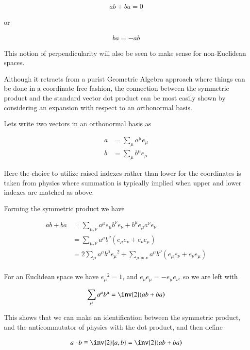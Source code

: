 \begin{align*}
a b + ba = 0
\end{align*}

or

\begin{align*}
b a = - a b
\end{align*}

This notion of perpendicularity will also be seen to make sense for non-Euclidean spaces.

Although it retracts from a purist Geometric Algebra approach where things can be done in a coordinate free fashion, the connection between the symmetric product and the standard vector dot product can be most easily shown by considering an expansion with respect to an orthonormal basis.

Lets write two vectors in an orthonormal basis as

\begin{align*}
a &= \sum_\mu a^\mu e_\mu \\
b &= \sum_\mu b^\mu e_\mu
\end{align*}

Here the choice to utilize raised indexes rather than lower for the coordinates is taken from physics where summation is typically implied when upper and lower indexes are matched as above.

Forming the symmetric product we have

\begin{align*}
a b + b a
&=
\sum_{\mu,\nu} a^\mu e_\mu b^\nu e_\nu + b^\mu e_\mu a^\nu e_\nu \\
&=
\sum_{\mu,\nu} a^\mu b^\nu \left( e_\mu e_\nu + e_\nu e_\mu \right) \\
&=
2 \sum_{\mu} a^\mu b^\mu {e_\mu}^2 + \sum_{\mu \ne \nu} a^\mu b^\nu \left( e_\mu e_\nu + e_\nu e_\mu \right) \\
\end{align*}

For an Euclidean space we have ${e_\mu}^2 = 1$, and $e_\nu e_\mu = -e_\mu e_\nu$, so we are left with

\begin{align*}
\sum_{\mu} a^\mu b^\mu = \inv{2} ( a b + b a)
\end{align*}

This shows that we can make an identification between the symmetric product, and the anticommutator of physics with the dot product, and then define

\begin{align}\label{eqn:intro_ga:dotDefined}
a \cdot b \equiv \inv{2} \symmetric{a}{b} = \inv{2} (a b + ba)
\end{align}

